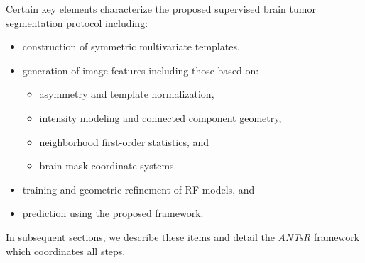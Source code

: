 \documentclass[preprint,authoryear,review,12pt]{elsarticle}
\begin{document}
Certain key elements characterize the proposed supervised brain tumor segmentation
protocol including:
\begin{itemize}
  \item construction of symmetric multivariate templates,
  \item generation of image features including those based on:
    \begin{itemize}
      \item asymmetry and template normalization, 
      \item intensity modeling and connected component geometry,      
      \item neighborhood first-order statistics, and
      \item brain mask coordinate systems.
    \end{itemize}
  \item training and geometric refinement of RF models, and
  \item prediction using the proposed framework.
\end{itemize}
In subsequent sections, we describe these items and detail the
\textit{ANTsR} framework which coordinates all steps.
\end{document}
